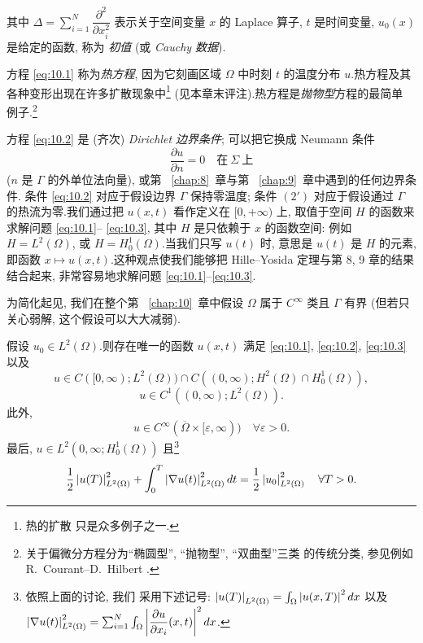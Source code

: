 其中 $\Delta=\sum_{i=1}^N\dfrac{\partial^2}{\partial x_i^2}$ 表示关于空间变量
$x$ 的 Laplace 算子, $t$ 是时间变量, $u_0(x)$ 是给定的函数, 称为
\emph{初值} (或 \emph{Cauchy 数据}).

方程 \eqref{eq:10.1} 称为\emph{热方程}, 因为它刻画区域 $\Omega$ 中时刻 $t$
的温度分布 $u$.热方程及其各种变形出现在许多扩散现象中\footnote{热的扩散
只是众多例子之一.} (见本章末评注).热方程是\emph{抛物型}方程的最简单
例子.\footnote{关于偏微分方程分为``椭圆型'', ``抛物型'', ``双曲型''三类
的传统分类, 参见例如 R.~Courant--D.~Hilbert .}

方程 \eqref{eq:10.2} 是 (齐次) \emph{Dirichlet 边界条件}; 可以把它换成
Neumann 条件
\begin{equation*}
\frac{\partial u}{\partial n}=0\quad\text{在}\ \Sigma\ \text{上}
\tag*{(2$'$)}
\end{equation*}
($n$ 是 $\Gamma$ 的外单位法向量), 或第~
\ref{chap:8}~章与第~
\ref{chap:9}~章中遇到的任何边界条件.
条件 \eqref{eq:10.2} 对应于假设边界 $\Gamma$ 保持零温度; 条件 $(2')$
对应于假设通过 $\Gamma$ 的热流为零.我们通过把 $u(x,t)$ 看作定义在
$[0,+\infty)$ 上, 取值于空间 $H$ 的函数来求解问题 \eqref{eq:10.1}--
\eqref{eq:10.3}, 其中 $H$ 是只依赖于 $x$ 的函数空间: 例如 $H=L^2(\Omega)$,
或 $H=H_0^1(\Omega)$.当我们只写 $u(t)$ 时, 意思是 $u(t)$ 是 $H$ 的元素,
即函数 $x\mapsto u(x,t)$.这种观点使我们能够把 Hille--Yosida 定理与第 8, 9
章的结果结合起来, 非常容易地求解问题 \eqref{eq:10.1}--\eqref{eq:10.3}.

为简化起见, 我们在整个第~
\ref{chap:10}~章中假设 $\Omega$ 属于 $C^\infty$ 类且
$\Gamma$ 有界 (但若只关心弱解, 这个假设可以大大减弱).

\begin{keytheorem}
\label{thm:10.1}
假设 $u_0\in L^2(\Omega)$.则存在唯一的函数 $u(x,t)$ 满足
\eqref{eq:10.1}, \eqref{eq:10.2}, \eqref{eq:10.3} 以及
\begin{equation}
u\in C([0,\infty);L^2(\Omega))\cap C((0,\infty);H^2(\Omega)\cap
H_0^1(\Omega)),
\label{eq:10.4}
\end{equation}
\begin{equation}
u\in C^1((0,\infty);L^2(\Omega)).
\label{eq:10.5}
\end{equation}
此外,
\begin{equation*}
u\in C^\infty(\overline\Omega\times[\varepsilon,\infty))
\quad\forall\varepsilon>0.
\end{equation*}
最后, $u\in L^2(0,\infty;H_0^1(\Omega))$ 且\footnote{依照上面的讨论, 我们
采用下述记号:
$\left|u(T)\right|_{L^2(\Omega)}=\int_\Omega\left|u(x,T)\right|^2dx$ 以及
$\left|\nabla u(t)\right|^2_{L^2(\Omega)}
=\sum_{i=1}^N\int_\Omega\left|\dfrac{\partial u}{\partial x_i}(x,t)\right|^2dx$.}
\begin{equation}
\frac12\left|u(T)\right|_{L^2(\Omega)}^2
+\int_0^T\left|\nabla u(t)\right|^2_{L^2(\Omega)}dt
=\frac12\left|u_0\right|_{L^2(\Omega)}^2\quad\forall T>0.
\label{eq:10.6}
\end{equation}
\end{keytheorem}

